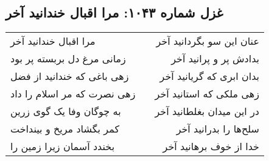 \begin{center}
\section*{غزل شماره ۱۰۴۳: مرا اقبال خندانید آخر}
\label{sec:1043}
\begin{longtable}{l p{0.5cm} r}
مرا اقبال خندانید آخر
&&
عنان این سو بگردانید آخر
\\
زمانی مرغ دل بربسته پر بود
&&
بدادش پر و پرانید آخر
\\
زهی باغی که خندانید از فضل
&&
بدان ابری که گریانید آخر
\\
زهی نصرت که مر اسلام را داد
&&
زهی ملکی که استانید آخر
\\
به چوگان وفا یک گوی زرین
&&
در این میدان بغلطانید آخر
\\
کمر بگشاد مریخ و بینداخت
&&
سلح‌ها را بدرانید آخر
\\
بخندد آسمان زیرا زمین را
&&
خدا از خوف برهانید آخر
\\
\end{longtable}
\end{center}
